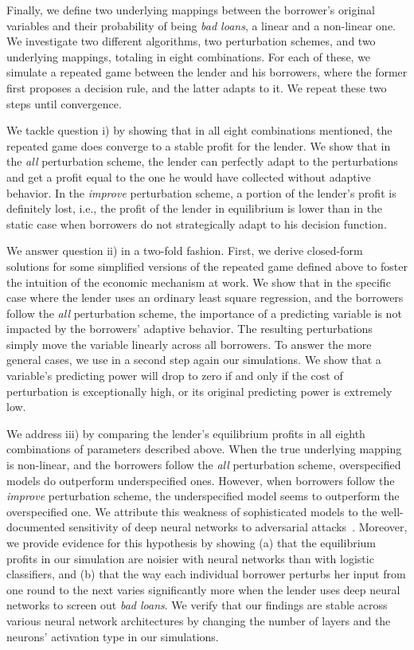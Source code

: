 \documentclass[12pt]{article} %
\begin{document}
Finally, we define two underlying mappings between the borrower's original variables and their probability of being \textit{bad loans}, a linear and a non-linear one. 
We investigate two different algorithms, two perturbation schemes, and two underlying mappings, totaling in eight combinations. For each of these, we simulate a repeated game between the lender and his borrowers, where the former first proposes a decision rule, and the latter adapts to it. We repeat these two steps until convergence. 

We tackle question i) by showing that in all eight combinations mentioned, the repeated game does converge to a stable profit for the lender. We show that in the \textit{all} perturbation scheme, the lender can perfectly adapt to the perturbations and get a profit equal to the one he would have collected without adaptive behavior. In the \textit{improve} perturbation scheme, a portion of the lender's profit is definitely lost, i.e., the profit of the lender in equilibrium is lower than in the static case when borrowers do not strategically adapt to his decision function. 

We answer question ii) in a two-fold fashion. First, we derive closed-form solutions for some simplified versions of the repeated game defined above to foster the intuition of the economic mechanism at work. We show that in the specific case where the lender uses an ordinary least square regression, and the borrowers follow the \textit{all} perturbation scheme, the importance of a predicting variable is not impacted by the borrowers' adaptive behavior. The resulting perturbations simply move the variable linearly across all borrowers. To answer the more general cases, we use in a second step again our simulations. We show that a variable's predicting power will drop to zero if and only if the cost of perturbation is exceptionally high, or its original predicting power is extremely low. 

We address iii) by comparing the lender's equilibrium profits in all eighth combinations of parameters described above. When the true underlying mapping is non-linear, and the borrowers follow the \textit{all} perturbation scheme, overspecified models do outperform underspecified ones. However, when borrowers follow the \textit{improve} perturbation scheme, the underspecified model seems to outperform the overspecified one. We attribute this weakness of sophisticated models to the well-documented sensitivity of deep neural networks to adversarial attacks~\citep{szegedy2013intriguing}. Moreover, we provide evidence for this hypothesis by showing (a) that the equilibrium profits in our simulation are noisier with neural networks than with logistic classifiers, and (b) that the way each individual borrower perturbs her input from one round to the next varies significantly more when the lender uses deep neural networks to screen out \textit{bad loans}. We verify that our findings are stable across various neural network architectures by changing the number of layers and the neurons' activation type in our simulations. 
\end{document}
